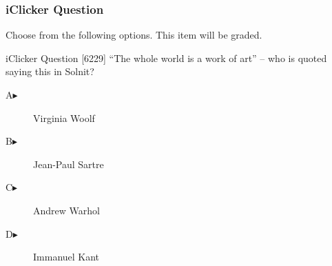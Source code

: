 \begin{frame}
  \frametitle{iClicker Question}
Choose from the following options. This item will be graded.
\begin{block}{iClicker Question}
[6229] ``The whole world is a work of art'' -- who is quoted saying this in Solnit?
\end{block}
\begin{description}
\item[A\hspace{.2in}$\blacktriangleright$] Virginia Woolf
\item[B\hspace{.2in}$\blacktriangleright$] Jean-Paul Sartre
\item[C\hspace{.2in}$\blacktriangleright$] Andrew Warhol
\item[D\hspace{.2in}$\blacktriangleright$] Immanuel Kant
\end{description}
\end{frame}
